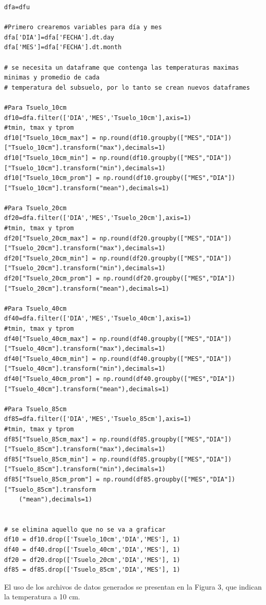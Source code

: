 \documentclass[11pt, spanish]{report}
\begin{document}
\begin{verbatim}
dfa=dfu

#Primero crearemos variables para día y mes
dfa['DIA']=dfa['FECHA'].dt.day
dfa['MES']=dfa['FECHA'].dt.month

# se necesita un dataframe que contenga las temperaturas maximas minimas y promedio de cada 
# temperatura del subsuelo, por lo tanto se crean nuevos dataframes

#Para Tsuelo_10cm 
df10=dfa.filter(['DIA','MES','Tsuelo_10cm'],axis=1)
#tmin, tmax y tprom
df10["Tsuelo_10cm_max"] = np.round(df10.groupby(["MES","DIA"])
["Tsuelo_10cm"].transform("max"),decimals=1)
df10["Tsuelo_10cm_min"] = np.round(df10.groupby(["MES","DIA"])
["Tsuelo_10cm"].transform("min"),decimals=1)
df10["Tsuelo_10cm_prom"] = np.round(df10.groupby(["MES","DIA"])["Tsuelo_10cm"].transform("mean"),decimals=1)

#Para Tsuelo_20cm  
df20=dfa.filter(['DIA','MES','Tsuelo_20cm'],axis=1)
#tmin, tmax y tprom
df20["Tsuelo_20cm_max"] = np.round(df20.groupby(["MES","DIA"])
["Tsuelo_20cm"].transform("max"),decimals=1)
df20["Tsuelo_20cm_min"] = np.round(df20.groupby(["MES","DIA"])
["Tsuelo_20cm"].transform("min"),decimals=1)
df20["Tsuelo_20cm_prom"] = np.round(df20.groupby(["MES","DIA"])["Tsuelo_20cm"].transform("mean"),decimals=1)

#Para Tsuelo_40cm 
df40=dfa.filter(['DIA','MES','Tsuelo_40cm'],axis=1)
#tmin, tmax y tprom
df40["Tsuelo_40cm_max"] = np.round(df40.groupby(["MES","DIA"])
["Tsuelo_40cm"].transform("max"),decimals=1)
df40["Tsuelo_40cm_min"] = np.round(df40.groupby(["MES","DIA"])
["Tsuelo_40cm"].transform("min"),decimals=1)
df40["Tsuelo_40cm_prom"] = np.round(df40.groupby(["MES","DIA"])["Tsuelo_40cm"].transform("mean"),decimals=1)

#Para Tsuelo_85cm 
df85=dfa.filter(['DIA','MES','Tsuelo_85cm'],axis=1)
#tmin, tmax y tprom
df85["Tsuelo_85cm_max"] = np.round(df85.groupby(["MES","DIA"])
["Tsuelo_85cm"].transform("max"),decimals=1)
df85["Tsuelo_85cm_min"] = np.round(df85.groupby(["MES","DIA"])
["Tsuelo_85cm"].transform("min"),decimals=1)
df85["Tsuelo_85cm_prom"] = np.round(df85.groupby(["MES","DIA"])["Tsuelo_85cm"].transform
    ("mean"),decimals=1)


# se elimina aquello que no se va a graficar
df10 = df10.drop(['Tsuelo_10cm','DIA','MES'], 1)
df40 = df40.drop(['Tsuelo_40cm','DIA','MES'], 1)
df20 = df20.drop(['Tsuelo_20cm','DIA','MES'], 1)
df85 = df85.drop(['Tsuelo_85cm','DIA','MES'], 1)
\end{verbatim}
El uso de los archivos de datos generados se presentan en la Figura 3, que indican la temperatura a 10 cm.
\end{document}
